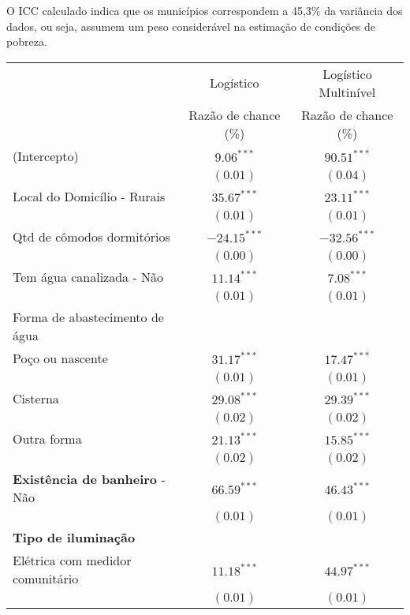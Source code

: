 \documentclass[a4paper, 12pt, openright, oneside, english, brazil, article]{abntex2}
\begin{document}
	O ICC calculado indica que os municípios correspondem a 45,3\% da variância dos dados, ou seja, assumem um peso considerável na estimação de condições de pobreza.
	
	\begin{table}[!h]
		{\begin{tabular}{l c c}
				\hline
				& Logístico & Logístico Multinível \\
				& Razão de chance (\%)  & Razão de chance (\%) \\
				\hline
				(Intercepto)                                                 & $9.06^{***}$  & $90.51^{***}$  \\
				& $(0.01)$      & $(0.04)$      \\
				Local do Domicílio - Rurais                                & $35.67^{***}$  & $23.11^{***}$  \\
				& $(0.01)$      & $(0.01)$      \\
				Qtd de cômodos dormitórios                               & $-24.15^{***}$ & $-32.56^{***}$ \\
				& $(0.00)$      & $(0.00)$      \\
				Tem água canalizada - Não                               & $11.14^{***}$  & $7.08^{***}$  \\
				& $(0.01)$      & $(0.01)$      \\
				Forma de abastecimento de água &   &   \\
				Poço ou nascente               & $31.17^{***}$  & $17.47^{***}$  \\
				& $(0.01)$      & $(0.01)$      \\
				Cisterna                       & $29.08^{***}$  & $29.39^{***}$  \\
				& $(0.02)$      & $(0.02)$      \\
				Outra forma                    & $21.13^{***}$  & $15.85^{***}$  \\
				& $(0.02)$      & $(0.02)$      \\
				\textbf{Existência de banheiro} - Não                 & $66.59^{***}$  & $46.43^{***}$  \\
				& $(0.01)$      & $(0.01)$      \\
				\textbf{Tipo de iluminação}   &    &    \\
				Elétrica com medidor comunitário & $11.18^{***}$  & $44.97^{***}$  \\
				& $(0.01)$      & $(0.01)$      \\

\end{tabular}}
\end{table}
\end{document}
